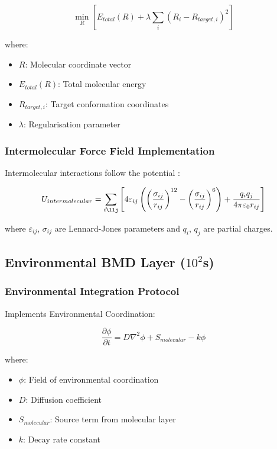 \documentclass[12pt,a4paper]{article}
\begin{document}
\begin{equation}
\min_{R} \left[ E_{total}(R) + \lambda \sum_i (R_i - R_{target,i})^2 \right]
\end{equation}

where:
\begin{itemize}
\item $R$: Molecular coordinate vector
\item $E_{total}(R)$: Total molecular energy
\item $R_{target,i}$: Target conformation coordinates
\item $\lambda$: Regularisation parameter
\end{itemize}

\subsubsection{Intermolecular Force Field Implementation}

Intermolecular interactions follow the potential \cite{stone2013theory}:

\begin{equation}
U_{intermolecular} = \sum_{i\llj} \left[ 4\varepsilon_{ij} \left( \left(\frac{\sigma_{ij}}{r_{ij}}\right)^{12} - \left(\frac{\sigma_{ij}}{r_{ij}}\right)^6 \right) + \frac{q_i q_j}{4\pi\varepsilon_0 r_{ij}} \right]
\end{equation}

where $\varepsilon_{ij}$, $\sigma_{ij}$ are Lennard-Jones parameters and $q_i$, $q_j$ are partial charges.

\subsection{Environmental BMD Layer ($10^2$s)}

\subsubsection{Environmental Integration Protocol}

Implements Environmental Coordination:

\begin{equation}
\frac{\partial \phi}{\partial t} = D \nabla^2 \phi + S_{molecular} - k \phi
\end{equation}

where:
\begin{itemize}
\item $\phi$: Field of environmental coordination
\item $D$: Diffusion coefficient  
\item $S_{molecular}$: Source term from molecular layer
\item $k$: Decay rate constant
\end{itemize}
\end{document}
